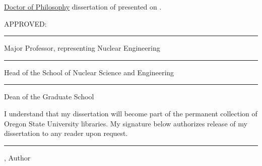 \documentclass[12pt]{article}
\begin{document}
\singlespacing

\noindent
\underline{Doctor of Philosophy} dissertation of \underline{\ThesisAuthor} presented on \underline{\DefenseDate}.

\vspace{1cm}

\noindent
APPROVED:

\vspace{1cm}


\noindent
\rule{\textwidth}{0.4pt}

\noindent
Major Professor, representing Nuclear Engineering

\vspace{2cm}

\noindent
\rule{\textwidth}{0.4pt}

\noindent
Head of the School of Nuclear Science and Engineering

\vspace{2cm}

\noindent
\rule{\textwidth}{0.4pt}

\noindent
Dean of the Graduate School

\vspace{3cm}

\noindent
I understand that my dissertation will become part of the permanent collection of Oregon State University libraries. My signature below authorizes release of my dissertation to any reader upon request.

\vspace{2cm}

\noindent
\rule{\textwidth}{0.4pt}

\noindent
\centering \ThesisAuthor, Author
\end{document}
